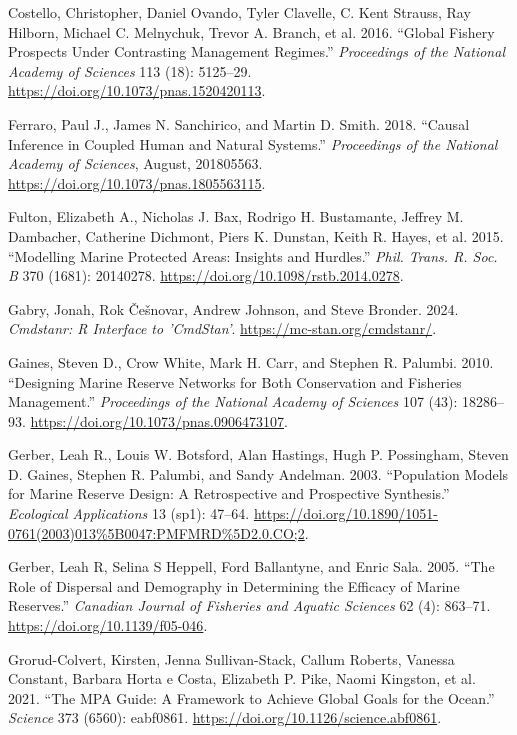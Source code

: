 \documentclass[
  default,
  lineno,
  referee]{sn-jnl}
\newlength{\cslhangindent}
\newenvironment{CSLReferences}[2] %
 {\begin{list}{}{%
  \setlength{\itemindent}{0pt}
  \setlength{\leftmargin}{0pt}
  \setlength{\parsep}{0pt}
  \ifodd #1
   \setlength{\leftmargin}{\cslhangindent}
   \setlength{\itemindent}{-1\cslhangindent}
  \fi
  \setlength{\itemsep}{#2\baselineskip}}}
 {\end{list}}
\begin{document}
\begin{CSLReferences}{1}{0}
Costello, Christopher, Daniel Ovando, Tyler Clavelle, C. Kent Strauss,
Ray Hilborn, Michael C. Melnychuk, Trevor A. Branch, et al. 2016.
{``Global Fishery Prospects Under Contrasting Management Regimes.''}
\emph{Proceedings of the National Academy of Sciences} 113 (18):
5125--29. \url{https://doi.org/10.1073/pnas.1520420113}.

Ferraro, Paul J., James N. Sanchirico, and Martin D. Smith. 2018.
{``Causal Inference in Coupled Human and Natural Systems.''}
\emph{Proceedings of the National Academy of Sciences}, August,
201805563. \url{https://doi.org/10.1073/pnas.1805563115}.

Fulton, Elizabeth A., Nicholas J. Bax, Rodrigo H. Bustamante, Jeffrey M.
Dambacher, Catherine Dichmont, Piers K. Dunstan, Keith R. Hayes, et al.
2015. {``Modelling Marine Protected Areas: Insights and Hurdles.''}
\emph{Phil. Trans. R. Soc. B} 370 (1681): 20140278.
\url{https://doi.org/10.1098/rstb.2014.0278}.

Gabry, Jonah, Rok Češnovar, Andrew Johnson, and Steve Bronder. 2024.
\emph{Cmdstanr: R Interface to 'CmdStan'}.
\url{https://mc-stan.org/cmdstanr/}.

Gaines, Steven D., Crow White, Mark H. Carr, and Stephen R. Palumbi.
2010. {``Designing Marine Reserve Networks for Both Conservation and
Fisheries Management.''} \emph{Proceedings of the National Academy of
Sciences} 107 (43): 18286--93.
\url{https://doi.org/10.1073/pnas.0906473107}.

Gerber, Leah R., Louis W. Botsford, Alan Hastings, Hugh P. Possingham,
Steven D. Gaines, Stephen R. Palumbi, and Sandy Andelman. 2003.
{``Population Models for Marine Reserve Design: A Retrospective and
Prospective Synthesis.''} \emph{Ecological Applications} 13 (sp1):
47--64.
\url{https://doi.org/10.1890/1051-0761(2003)013\%5B0047:PMFMRD\%5D2.0.CO;2}.

Gerber, Leah R, Selina S Heppell, Ford Ballantyne, and Enric Sala. 2005.
{``The Role of Dispersal and Demography in Determining the Efficacy of
Marine Reserves.''} \emph{Canadian Journal of Fisheries and Aquatic
Sciences} 62 (4): 863--71. \url{https://doi.org/10.1139/f05-046}.

Grorud-Colvert, Kirsten, Jenna Sullivan-Stack, Callum Roberts, Vanessa
Constant, Barbara Horta e Costa, Elizabeth P. Pike, Naomi Kingston, et
al. 2021. {``The MPA Guide: A Framework to Achieve Global Goals for the
Ocean.''} \emph{Science} 373 (6560): eabf0861.
\url{https://doi.org/10.1126/science.abf0861}.


\end{CSLReferences}
\end{document}
